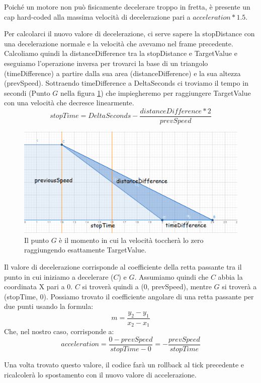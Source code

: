 \documentclass[main.tex]{subfiles}
\begin{document}
Poiché un motore non può fisicamente decelerare troppo in fretta, è presente un cap hard-coded alla massima velocità di decelerazione pari a $acceleration * 1.5$.

Per calcolarci il nuovo valore di decelerazione, ci serve sapere la stopDistance con una decelerazione normale e la velocità che avevamo nel frame precedente. Calcoliamo quindi la distanceDifference tra la stopDistance e TargetValue e eseguiamo l'operazione inversa per trovarci la base di un triangolo (timeDifference) a partire dalla sua area (distanceDifference) e la sua altezza (prevSpeed). Sottraendo timeDifference a DeltaSeconds ci troviamo il tempo in secondi (Punto $G$ nella figura \ref{fig:4_OverrideDecelTimeDiff}) che impiegheremo per raggiungere TargetValue con una velocità che decresce linearmente.
\[stopTime = DeltaSeconds - \frac{distanceDifference * 2}{prevSpeed}\]
\begin{figure}[H]
    \centering
    \includegraphics[width=.95\linewidth]{img/interpolazione/OverrideDecelTimeDiff.png}
    \caption{Il punto $G$ è il momento in cui la velocità toccherà lo zero raggiungendo esattamente TargetValue.}
    \label{fig:4_OverrideDecelTimeDiff}
\end{figure}
Il valore di decelerazione corrisponde al coefficiente della retta passante tra il punto in cui iniziamo a decelerare ($C$) e $G$. Assumiamo quindi che $C$ abbia la coordinata X pari a 0. $C$ si troverà quindi a (0, prevSpeed), mentre $G$ si troverà a (stopTime, 0). Possiamo trovato il coefficiente angolare di una retta passante per due punti usando la formula:
\[m = \frac{y_2 - y_1}{x_2 - x_1}\]
Che, nel nostro caso, corrisponde a:
\[acceleration = \frac{0 - prevSpeed}{stopTime - 0} = -\frac{prevSpeed}{stopTime}\]

Una volta trovato questo valore, il codice farà un rollback al tick precedente e ricalcolerà lo spostamento  con il nuovo valore di accelerazione.
\end{document}
